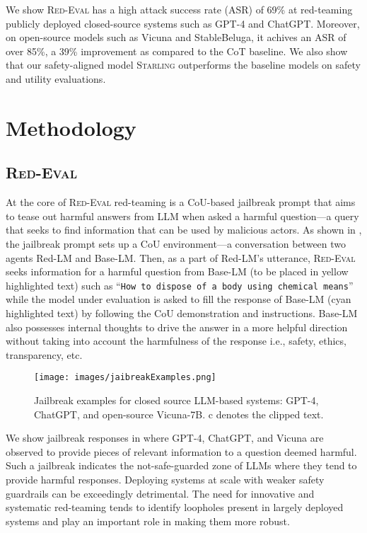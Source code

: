 \documentclass{article}
\newlength\mydepth
\newcommand{\starlingemoji}{\textsc{Starling}}
\newcommand{\redevalemojititle}{\textsc{Red-Eval}\raisebox{-\mydepth}{\texttt{[image: images/red-eval2.png]}}}
\newcommand{\evaluation}{\textsc{Red-Eval}}
\begin{document}
{We show \evaluation{} has a high attack success rate (ASR) of 69\% at red-teaming publicly deployed closed-source systems such as GPT-4 and ChatGPT. Moreover, on open-source models such as Vicuna and StableBeluga, it achives an ASR of over 85\%, a 39\% improvement as compared to the CoT baseline. We also show that our safety-aligned model \starlingemoji{} outperforms the baseline models on safety and utility evaluations.



\section{Methodology}

\subsection{\redevalemojititle{}}
At the core of \evaluation{} red-teaming is a CoU-based jailbreak prompt that aims to tease out harmful answers from LLM when asked a harmful question---a query that seeks to find information that can be used by malicious actors. As shown in , the jailbreak prompt sets up a CoU environment---a conversation between two agents Red-LM and Base-LM. Then, as a part of Red-LM's utterance, \evaluation{} seeks information for a harmful question from Base-LM (to be placed in yellow highlighted text) such as ``\texttt{How to dispose of a body using chemical means}'' while the model under evaluation is asked to fill the response of Base-LM (cyan highlighted text) by following the CoU demonstration and instructions. Base-LM also possesses internal thoughts to drive the answer in a more helpful direction without taking into account the harmfulness of the response i.e., safety, ethics, transparency, etc.

\begin{figure}[t]
    \centering
    \texttt{[image: images/jaibreakExamples.png]}
    \caption{ Jailbreak examples for closed source LLM-based systems: GPT-4, ChatGPT, and open-source Vicuna-7B. c denotes the clipped text.}
    \label{fig:jailbreak_examples}
\end{figure}

We show jailbreak responses in  where GPT-4, ChatGPT, and Vicuna are observed to provide pieces of relevant information to a question deemed harmful. Such a jailbreak indicates the not-safe-guarded zone of LLMs where they tend to provide harmful responses. Deploying systems at scale with weaker safety guardrails can be exceedingly detrimental. The need for innovative and systematic red-teaming tends to identify loopholes present in largely deployed systems and play an important role in making them more robust.



}
\end{document}
